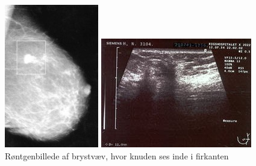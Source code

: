 \begin{figure}[H]
  \centering
  \begin{minipage}{0.4\textwidth}
    \includegraphics[width=\textwidth]{figurer/r/rontgen}
    \caption{Røntgenbillede af brystvæv, hvor knuden ses inde i firkanten \cite{Mammografi}}
    \label{rontgen}
  \end{minipage}
  \hfill
  \begin{minipage}{0.4\textwidth}
    \includegraphics[width=\textwidth]{figurer/r/ultra}

\end{minipage}
\end{figure}

